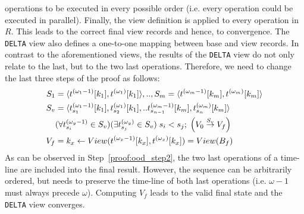 operations to be executed in every possible order (i.e. every operation 
could be executed in parallel). Finally, the view definition is applied 
to every operation in $R$. This leads to the correct final view records 
and hence, to convergence. The \texttt{DELTA} view also defines a 
one-to-one mapping between base and view records. In contrast to the 
aforementioned views, the results of the \texttt{DELTA} view do not only 
relate to the last, but to the two last operations. Therefore, we need 
to change the last three steps of the proof as follows: 
%
\begin{subequations}
  \begin{align}
  S_1&=\langle t^{(\omega_1-1)}[k_{1}],t^{(\omega_1)}[k_{1}]\rangle,..,S_m=\langle t^{(\omega_m-1)}[k_{m}],t^{(\omega_m)}[k_{m}]\rangle\\
   S_v&=\langle t_{s_1}^{(\omega_1-1)}[k_{1}],t_{s_2}^{(\omega_1)}[k_{1}],..t_{s_{n-1}}^{(\omega_m-1)}[k_{m}],t_{s_n}^{(\omega_m)}[k_{m}]\rangle\label{proof:ood_step2}\\
   &(\forall t_{s_i}^{(\omega_y-1)}\in S_v)(\exists t_{s_j}^{(\omega_y)}\in S_v)\;s_i < s_j;\;\Big(V_0\overset{S_v}{\rightarrow}V_f\Big)\notag\\
 	V_f&=k_x\leftarrow View(t^{(\omega_x-1)}[k_x],t^{(\omega_x)}[k_x])=View(B_f)
  \end{align}
\end{subequations}
%
As can be observed in Step~\ref{proof:ood_step2}, the two last 
operations of a time-line are included into the final result. However, 
the sequence can be arbitrarily ordered, but needs to preserve the 
time-line of both last operations (i.e. $\omega-1$ must always precede 
$\omega$). Computing $V_f$ leads to the valid final state and the 
\texttt{DELTA} view converges. 

